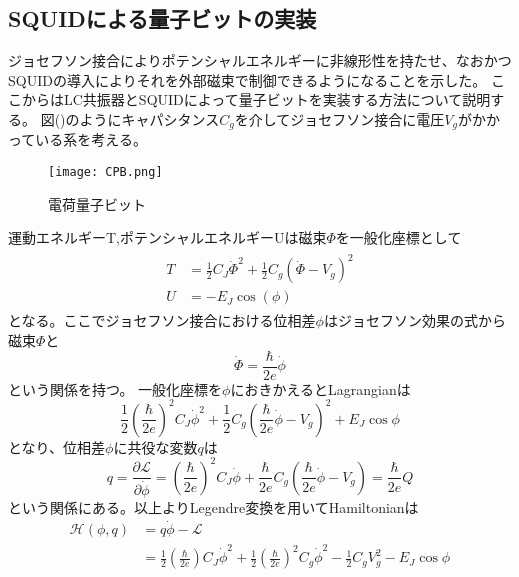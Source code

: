         \subsection{SQUIDによる量子ビットの実装}
        ジョセフソン接合によりポテンシャルエネルギーに非線形性を持たせ、なおかつSQUIDの導入によりそれを外部磁束で制御できるようになることを示した。
        ここからはLC共振器とSQUIDによって量子ビットを実装する方法について説明する。
        図()のようにキャパシタンス$C_g$を介してジョセフソン接合に電圧$V_g$がかかっている系を考える。
        \begin{figure}[H]
            \begin{center}
                \texttt{[image: CPB.png]}
                \caption{電荷量子ビット}
            \end{center}
        \end{figure}
        運動エネルギーT,ポテンシャルエネルギーUは磁束$\Phi$を一般化座標として
        \begin{eqnarray}
            \begin{aligned}
                T&=\frac{1}{2}C_J\dot{\Phi}^2+\frac{1}{2}C_g(\dot{\Phi}-V_g)^2\\
                U&=-E_J\cos(\phi)
            \end{aligned}
        \end{eqnarray}
        となる。ここでジョセフソン接合における位相差$\phi$はジョセフソン効果の式から磁束$\Phi$と
        \begin{equation}
            \dot{\Phi}=\frac{\hbar}{2e}\dot{\phi}
        \end{equation}
        という関係を持つ。
        一般化座標を$\phi$におきかえるとLagrangianは
        \begin{equation}
            \frac{1}{2}\left(\frac{\hbar}{2 e}\right)^{2} C_{J} \dot{\phi}^{2}+\frac{1}{2} C_{g}\left(\frac{\hbar}{2 e} \dot{\phi}-V_{g}\right)^{2}+E_{J} \cos \phi
        \end{equation}
        となり、位相差$\phi$に共役な変数$q$は
        \begin{equation}
            q=\frac{\partial \mathcal{L}}{\partial \dot{\phi}}=\left(\frac{\hbar}{2 e}\right)^{2} C_{J} \dot{\phi}+\frac{\hbar}{2 e} C_{g}\left(\frac{\hbar}{2 e} \dot{\phi}-V_{g}\right)=\frac{\hbar}{2 e} Q
        \end{equation}
        という関係にある。以上よりLegendre変換を用いてHamiltonianは
        \begin{equation}
        \begin{split}
            \mathcal{H}(\phi, q)
            &=q \dot{\phi}-\mathcal{L}\\
            &=\frac{1}{2}\left(\frac{\hbar}{2 e}\right)C_{J} \dot{\phi}^{2}+\frac{1}{2}\left(\frac{\hbar}{2 e}\right)^{2} C_{g} \dot{\phi}^{2}-\frac{1}{2} C_{g} V_{g}^{2}-E_{J} \cos \phi
        \end{split}
        \end{equation}
